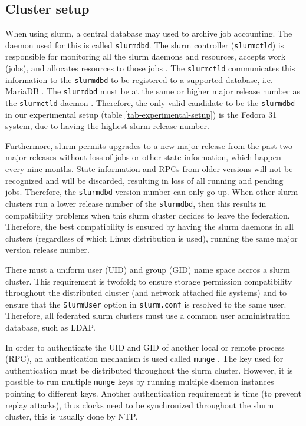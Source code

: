 \documentclass[conference]{IEEEtran}
\begin{document}
\subsection{Cluster setup}
When using \gls{slurm}, a central database may used to archive job accounting. The daemon used for this is called \texttt{slurmdbd}. The \gls{slurm} controller (\texttt{slurmctld}) is responsible for monitoring all the \gls{slurm} daemons and resources, accepts work (jobs), and allocates resources to those jobs \cite{slurm-slurmctld}. The \texttt{slurmctld} communicates this information to the \texttt{slurmdbd} to be registered to a supported database, i.e. MariaDB \cite{mariadb}. The \texttt{slurmdbd} must be at the same or higher major release number as the \texttt{slurmctld} daemon \cite{slurm-upgrade-guide}. Therefore, the only valid candidate to be the \texttt{slurmdbd} in our experimental setup (table \ref{tab-experimental-setup}) is the Fedora 31 system, due to having the highest \gls{slurm} release number.

Furthermore, \gls{slurm} permits upgrades to a new major release from the past two major releases without loss of jobs or other state information, which happen every nine months. State information and RPCs from older versions will not be recognized and will be discarded, resulting in loss of all running and pending jobs. Therefore, the \texttt{slurmdbd} version number can only go up. When other \gls{slurm} clusters run a lower release number of the \texttt{slurmdbd}, then this results in compatibility problems when this \gls{slurm} cluster decides to leave the federation. Therefore, the best compatibility is ensured by having the \gls{slurm} daemons in all clusters (regardless of which Linux distribution is used), running the same major version release number.

There must a uniform user (UID) and group (GID) name space accros a \gls{slurm} cluster. This requirement is twofold; to ensure storage permission compatibility throughout the distributed cluster (and network attached file systems) and to ensure that the \texttt{SlurmUser} option in \texttt{slurm.conf} is resolved to the same user. Therefore, all federated \gls{slurm} clusters must use a common user administration database, such as LDAP.

In order to authenticate the UID and GID of another local or remote process (RPC), an authentication mechanism is used called \texttt{munge} \cite{github-munge}. The key used for authentication must be distributed throughout the \gls{slurm} cluster. However, it is possible to run multiple \texttt{munge} keys by running multiple daemon instances pointing to different keys. Another authentication requirement is time (to prevent replay attacks), thus clocks need to be synchronized throughout the \gls{slurm} cluster, this is usually done by NTP.
\end{document}

